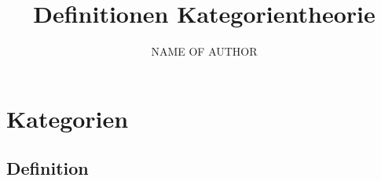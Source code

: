 \documentclass[10pt,twoside,openright]{memoir}
\author{NAME OF AUTHOR}
\title{Definitionen Kategorientheorie}
\date{}
\makeatletter
\def\maketitle{%
  \null
  \thispagestyle{empty}%
  \vfill
  \begin{center}\leavevmode
    \normalfont
    {\LARGE\raggedleft \@author\par}%
    \hrulefill\par
    {\huge\raggedright \@title\par}%
    \vskip 1cm
  \end{center}%
  \vfill
  \null
  \cleardoublepage
  }
\makeatother
\begin{document}
\let\cleardoublepage\clearpage


\maketitle

\frontmatter

\null\vfill

\mainmatter
\sloppy

\chapter{Kategorien}
\section{Definition}
\end{document}
